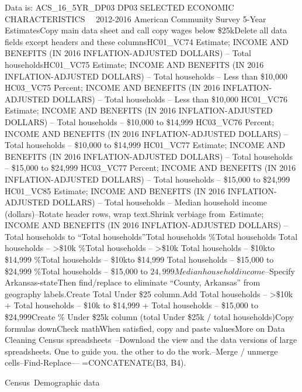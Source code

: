 \documentclass[]{book}
\begin{document}
Data is: ACS\_16\_5YR\_DP03 DP03 SELECTED ECONOMIC CHARACTERISTICS~ ~2012-2016 American Community Survey 5-Year EstimatesCopy main data sheet and call copy wages below \$25kDelete all data fields except headers and these columnsHC01\_VC74 Estimate; INCOME AND BENEFITS (IN 2016 INFLATION-ADJUSTED DOLLARS) -- Total householdsHC01\_VC75 Estimate; INCOME AND BENEFITS (IN 2016 INFLATION-ADJUSTED DOLLARS) -- Total households -- Less than \$10,000 HC03\_VC75 Percent; INCOME AND BENEFITS (IN 2016 INFLATION-ADJUSTED DOLLARS) -- Total households -- Less than \$10,000 HC01\_VC76 Estimate; INCOME AND BENEFITS (IN 2016 INFLATION-ADJUSTED DOLLARS) -- Total households -- \$10,000 to \$14,999 HC03\_VC76 Percent; INCOME AND BENEFITS (IN 2016 INFLATION-ADJUSTED DOLLARS) -- Total households -- \$10,000 to \$14,999 HC01\_VC77 Estimate; INCOME AND BENEFITS (IN 2016 INFLATION-ADJUSTED DOLLARS) -- Total households -- \$15,000 to \$24,999 HC03\_VC77 Percent; INCOME AND BENEFITS (IN 2016 INFLATION-ADJUSTED DOLLARS) -- Total households -- \$15,000 to \$24,999 HC01\_VC85 Estimate; INCOME AND BENEFITS (IN 2016 INFLATION-ADJUSTED DOLLARS) -- Total households -- Median household income (dollars)--Rotate header rows, wrap text.Shrink verbiage from~Estimate; INCOME AND BENEFITS (IN 2016 INFLATION-ADJUSTED DOLLARS) -- Total households to ``Total households''Total households \%Total households Total households -- \textgreater{}\$10k \%Total households -- \textgreater{}\$10k Total households -- \$10kto \$14,999 \%Total households -- \$10kto \$14,999 Total households -- \$15,000 to \$24,999 \%Total households -- \$15,000 to \(24,999 Median household income\)--Specify Arkansas-stateThen find/replace to eliminate ``County, Arkansas'' from geography labels.Create Total Under \$25 column.Add Total households -- \textgreater{}\$10k + Total households -- \$10k to \$14,999 + Total households -- \$15,000 to \$24,999Create \% Under \$25k column (total Under \$25k / total households)Copy formulas downCheck mathWhen satisfied, copy and paste valuesMore on Data Cleaning Census spreadsheets~--Download the view and the data versions of large spreadsheets. One to guide you. the other to do the work.--Merge / unmerge cells--Find-Replace--- =CONCATENATE(B3, B4).

Census~Demographic data
\end{document}
